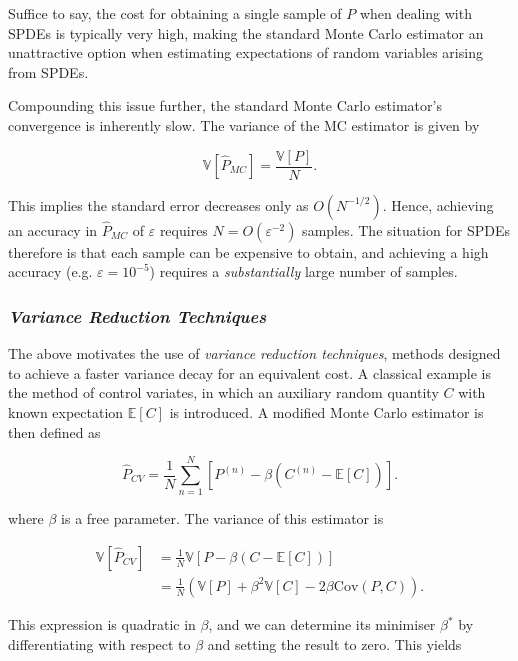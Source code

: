Suffice to say, the cost for obtaining a single sample of $P$ when dealing with 
SPDEs is typically very high, making the standard Monte Carlo estimator an 
unattractive option when estimating expectations of random variables arising from SPDEs.

Compounding this issue further, the standard Monte Carlo estimator's convergence is 
inherently slow. The variance of the MC estimator is given by 

\begin{equation*}
    \mathbb{V}[\hat{P}_{MC}] = \frac{\mathbb{V}[P]}{N}.
\end{equation*}

This implies the standard error decreases only as $O(N^{-1/2})$. Hence, 
achieving an accuracy in $\hat{P}_{MC}$ of $\varepsilon$ requires 
$N = O(\varepsilon^{-2})$ samples. The situation for SPDEs therefore is that 
each sample can be expensive to obtain, and achieving a high accuracy (e.g. 
$\varepsilon = 10^{-5}$) requires a \textit{substantially} large number of samples.

\subsubsection*{\textit{Variance Reduction Techniques}}

The above motivates the use of \textit{variance reduction techniques}, methods 
designed to achieve a faster variance decay for an equivalent cost. A classical 
example is the method of control variates, in which an auxiliary random 
quantity $C$ with known expectation $\mathbb{E}[C]$ is introduced. A modified 
Monte Carlo estimator is then defined as

\begin{equation*}
    \hat{P}_{CV} = \frac{1}{N}\sum_{n=1}^{N}\left[P^{(n)} - \beta(C^{(n)} - \mathbb{E}[C])\right].
\end{equation*}

where $\beta$ is a free parameter. The variance of this estimator is 

\begin{align*}
    \mathbb{V}[\hat{P}_{CV}] &= \frac{1}{N}\mathbb{V}[P - \beta(C-\mathbb{E}[C])] \\
     &= \frac{1}{N}\left(\mathbb{V}[P] + \beta^2\mathbb{V}[C] - 2\beta\mathrm{Cov}(P,C)\right).
\end{align*}

This expression is quadratic in $\beta$, and we can determine its minimiser 
$\beta^*$ by differentiating with respect to $\beta$ and setting the result to zero. 
This yields

